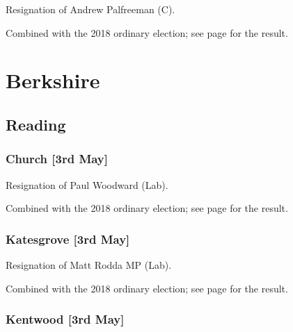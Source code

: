 \documentclass[a4paper,openany]{book}
\begin{document}
\begin{resultsiii}

Resignation of Andrew Palfreeman (C).

Combined with the 2018 ordinary election; see page \pageref{BirstallBirkenshawKirklees} for the result.

\section{Berkshire}

\subsection*{Reading}

\subsubsection*{Church \hspace*{\fill}\nolinebreak[1]%
\enspace\hspace*{\fill}
[3rd May]}


Resignation of Paul Woodward (Lab).

Combined with the 2018 ordinary election; see page \pageref{ChurchReading} for the result.

\subsubsection*{Katesgrove \hspace*{\fill}\nolinebreak[1]%
\enspace\hspace*{\fill}
[3rd May]}


Resignation of Matt Rodda MP (Lab).

Combined with the 2018 ordinary election; see page \pageref{KatesgroveReading} for the result.

\subsubsection*{Kentwood \hspace*{\fill}\nolinebreak[1]%
\enspace\hspace*{\fill}
[3rd May]}



\end{resultsiii}
\end{document}
